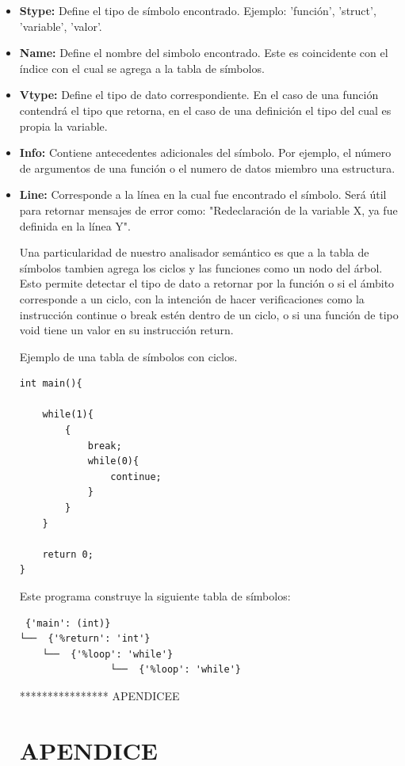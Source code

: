 \documentclass[12pt]{article}
\begin{document}
\begin{itemize}
    \item  \textbf{Stype:} Define el tipo de s\'imbolo encontrado. Ejemplo: 'funci\'on', 'struct', 'variable', 'valor'.
    \item  \textbf{Name:} Define el nombre del simbolo encontrado. Este es coincidente con el \'indice con el cual se agrega a la tabla de s\'imbolos.
    \item  \textbf{Vtype:} Define el tipo de dato correspondiente. En el caso de una funci\'on contendr\'a el tipo que retorna, en el caso de una definici\'on el tipo del cual es propia la variable. 
    \item  \textbf{Info:} Contiene antecedentes adicionales del s\'imbolo. Por ejemplo, el n\'umero de argumentos de una funci\'on o el numero de datos miembro una estructura. 
    \item  \textbf{Line:} Corresponde a la l\'inea en la cual fue encontrado el s\'imbolo. Ser\'a \'util para retornar mensajes de error como: "Redeclaraci\'on de la variable X, ya fue definida en la l\'inea Y". 

Una particularidad de nuestro analisador sem\'antico es que a la tabla de s\'imbolos tambien agrega los ciclos y las funciones como un nodo del \'arbol. Esto permite detectar el tipo de dato a retornar por la funci\'on o si el \'ambito corresponde a un ciclo, con la intenci\'on de hacer verificaciones como la instrucci\'on continue o break est\'en dentro de un ciclo, o si una funci\'on de tipo void tiene un valor en su instrucci\'on return.

Ejemplo de una tabla de s\'imbolos con ciclos.

\begin{verbatim}
int main(){

    while(1){
        {
            break;
            while(0){
                continue;
            }
        }
    }

    return 0;
}
\end{verbatim}

Este programa construye la siguiente tabla de s\'imbolos:
\begin{verbatim}
 {'main': (int)}
└──  {'%return': 'int'}
    └──  {'%loop': 'while'}
                └──  {'%loop': 'while'}
\end{verbatim}







**************** APENDICEE
\section*{APENDICE}


\end{itemize}
\end{document}
